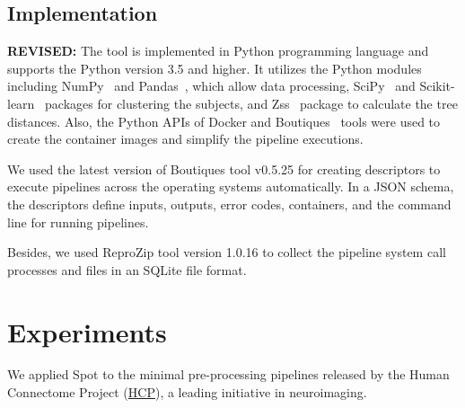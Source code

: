 \documentclass[a4paper,num-refs]{oup-contemporary}
\newcommand{\revised}[1]{\color{blue}\textbf{REVISED:}#1\color{black}}
\newcommand{\reprozip}[0]{ReproZip\xspace}
\newcommand{\toolname}[0]{Spot\xspace}
\begin{document}
\subsection{Implementation}
\revised{ 
The tool is implemented in Python programming language and supports the Python version 3.5 and higher.
It utilizes the Python modules including NumPy~\cite{oliphant2006guide} and Pandas~\cite{mckinney2011pandas}, 
which allow data processing, 
SciPy~\cite{2020SciPy-NMeth} and Scikit-learn~\cite{pedregosa2011scikit} packages 
for clustering the subjects, and Zss~\cite{zhang1989simple} package to calculate the tree distances.
Also, the Python APIs of Docker and Boutiques~\cite{glatard2018boutiques} tools were used to create the container 
images and simplify the pipeline executions.

We used the latest version of Boutiques tool v0.5.25 for creating descriptors 
to execute pipelines across the operating systems automatically.
In a JSON schema, the descriptors define inputs, outputs, error codes, containers, and the command line for running pipelines.

Besides, we used \reprozip tool version 1.0.16 to collect the pipeline system call processes and 
files in an SQLite file format.
}

\section{Experiments}

We applied \toolname to the minimal
pre-processing pipelines released by the Human Connectome Project
(\href{https://www.humanconnectome.org}{HCP}), a leading initiative in
neuroimaging. 



\end{document}
